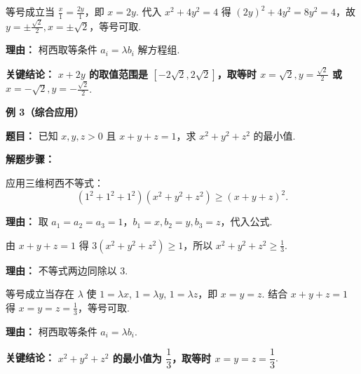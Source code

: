 \begin{examplebox}
\begin{description}[style=nextline, leftmargin=2.8em, labelsep=0.5em, itemsep=0.45em]
		\item[\textbf{第三步（取等求解）：}] 等号成立当 $\frac{x}{1} = \frac{2y}{1}$，即 $x=2y$. 代入 $x^2+4y^2=4$ 得 $(2y)^2+4y^2=8y^2=4$，故 $y=\pm\frac{\sqrt{2}}{2}, x=\pm\sqrt{2}$，等号可取.
			\par\textbf{理由：}
			柯西取等条件 $a_i = \lambda b_i$ 解方程组.
	\end{description}

	\textbf{\textcolor{CExample}{关键结论：}}
	\textbf{$x+2y$ 的取值范围是 $[-2\sqrt{2}, 2\sqrt{2}]$，取等时 $x=\sqrt{2},y=\frac{\sqrt{2}}{2}$ 或 $x=-\sqrt{2},y=-\frac{\sqrt{2}}{2}$}.

	\medskip
	\textbf{\textcolor{CExample}{例 3（综合应用）}}

	\textbf{\textcolor{CExample}{题目：}}
	已知 $x,y,z>0$ 且 $x+y+z=1$，求 $x^2+y^2+z^2$ 的最小值.

	\textbf{\textcolor{CExample}{解题步骤：}}
	\begin{description}[style=nextline, leftmargin=2.8em, labelsep=0.5em, itemsep=0.45em]
		\item[\textbf{第一步（构造三维柯西）：}] 应用三维柯西不等式：
			\[
				(1^2+1^2+1^2)(x^2+y^2+z^2) \ge (x+y+z)^2.
			\]
			\par\textbf{理由：}
			取 $a_1=a_2=a_3=1$，$b_1=x, b_2=y, b_3=z$，代入公式.

		\item[\textbf{第二步（代入求范围）：}] 由 $x+y+z=1$ 得 $3(x^2+y^2+z^2) \ge 1$，所以 $x^2+y^2+z^2 \ge \frac{1}{3}$.
			\par\textbf{理由：}
			不等式两边同除以 $3$.

		\item[\textbf{第三步（取等验证）：}] 等号成立当存在 $\lambda$ 使 $1 = \lambda x$, $1 = \lambda y$, $1 = \lambda z$，即 $x=y=z$. 结合 $x+y+z=1$ 得 $x=y=z=\frac{1}{3}$，等号可取.
			\par\textbf{理由：}
			柯西取等条件 $a_i = \lambda b_i$.
	\end{description}

	\textbf{\textcolor{CExample}{关键结论：}}
	\textbf{$x^2+y^2+z^2$ 的最小值为 $\dfrac{1}{3}$，取等时 $x=y=z=\dfrac{1}{3}$}.
\end{examplebox}
